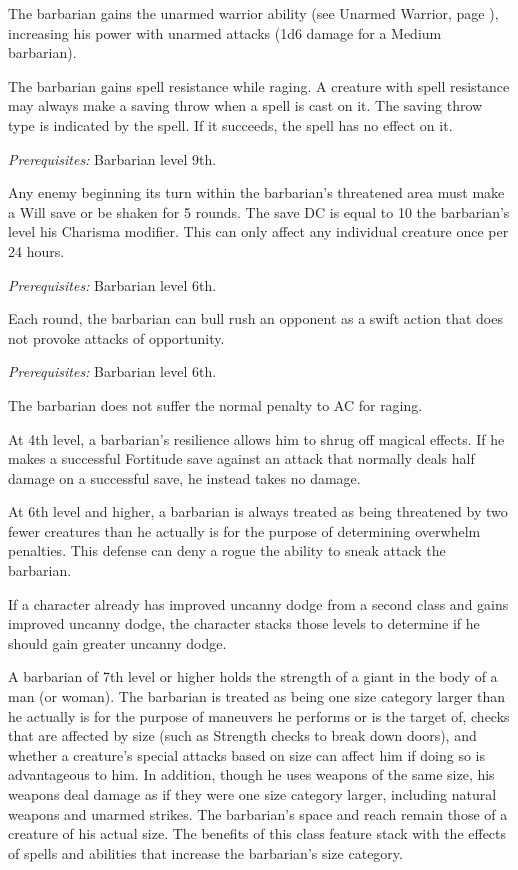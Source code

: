  The barbarian gains the unarmed warrior ability (see Unarmed Warrior, page ), increasing his power with unarmed attacks (1d6 damage for a Medium barbarian).

 The barbarian gains spell resistance while raging. A creature with spell resistance may always make a saving throw when a spell is cast on it. The saving throw type is indicated by the spell. If it succeeds, the spell has no effect on it.

\textit{Prerequisites:} Barbarian level 9th.

 Any enemy beginning its turn within the barbarian's threatened area must make a Will save or be shaken for 5 rounds. The save DC is equal to 10 \add the barbarian's level \add his Charisma modifier. This can only affect any individual creature once per 24 hours.

\textit{Prerequisites:} Barbarian level 6th.

 Each round, the barbarian can bull rush an opponent as a swift action that does not provoke attacks of opportunity.

\textit{Prerequisites:} Barbarian level 6th.

 The barbarian does not suffer the normal  penalty to AC for raging.

 At 4th level, a barbarian's resilience allows him to shrug off magical effects. If he makes a successful Fortitude save against an attack that normally deals half damage on a successful save, he instead takes no damage.

 At 6th level and higher, a barbarian is always treated as being threatened by two fewer creatures than he actually is for the purpose of determining overwhelm penalties. This defense can deny a rogue the ability to sneak attack the barbarian.
\par If a character already has improved uncanny dodge from a second class and gains improved uncanny dodge, the character stacks those levels to determine if he should gain greater uncanny dodge.

 A barbarian of 7th level or higher holds the strength of a giant in the body of a man (or woman). The barbarian is treated as being one size category larger than he actually is for the purpose of maneuvers he performs or is the target of, checks that are affected by size (such as Strength checks to break down doors), and whether a creature's special attacks based on size can affect him if doing so is advantageous to him. In addition, though he uses weapons of the same size, his weapons deal damage as if they were one size category larger, including natural weapons and unarmed strikes. The barbarian's space and reach remain those of a creature of his actual size. The benefits of this class feature stack with the effects of spells and abilities that increase the barbarian's size category.

